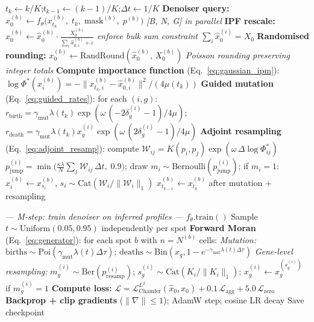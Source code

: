 \documentclass[11pt]{article}
\begin{document}
\begin{algorithm}[H]
\begin{algorithmic}[1]
      \State $t_k \leftarrow k/K$;\quad $t_{k-1} \leftarrow (k-1)/K$;\quad $\Delta t \leftarrow 1/K$
      \State \textbf{Denoiser query:}
        $\hat{x}_0^{(b)} \leftarrow f_\theta\!\bigl(x_{t_k}^{(b)},\; t_k,\; \text{mask}^{(b)},\; p^{(b)}\bigr)$
        \hfill\textit{[B, N, G] in parallel}
      \State \textbf{IPF rescale:} $\hat{x}_0^{(b)} \leftarrow \hat{x}_0^{(b)} \cdot \frac{X_0^{(b)}}{\sum_i \hat{x}_{0,i}^{(b)} + \varepsilon}$
        \hfill\textit{enforce bulk sum constraint $\sum_i \hat{x}_0^{(i)} = X_0$}
       
        \State \textbf{Randomised rounding:} $x_0^{(b)} \leftarrow \text{RandRound}(\hat{x}_0^{(b)},\, X_0^{(b)})$
        \hfill\textit{Poisson rounding preserving integer totals}
      \Else
        \State \textbf{Compute importance function} (Eq.~\ref{eq:gaussian_ipm}):
          $\log\Phi^*(x^{(b)}_i) = -\|x^{(b)}_{t_k,i} - \hat{x}_{0,i}^{(b)}\|^2 / (4\mu(t_k))$
        \State \textbf{Guided mutation} (Eq.~\ref{eq:guided_rates}): for each $(i,g)$:
        \Statex \qquad $r_{\text{birth}} = \gamma_{\text{mut}}\lambda(t_k)\exp(\omega\,(-2\delta_g^{(i)}-1)/4\mu)$;\;
                  $r_{\text{death}} = \gamma_{\text{mut}}\lambda(t_k) x_g^{(i)}\exp(\omega\,(2\delta_g^{(i)}-1)/4\mu)$
        \State \textbf{Adjoint resampling} (Eq.~\ref{eq:adjoint_resamp}): compute $\mathcal{W}_{ij} = K(p_i,p_j)\exp(\omega\,\Delta\log\Phi^*_{ij})$
        \Statex \qquad $p_{\text{jump}}^{(i)} = \min\!\bigl(\tfrac{\kappa\lambda}{N}\textstyle\sum_j \mathcal{W}_{ij}\,\Delta t,\; 0.9\bigr)$;
                  draw $m_i \sim \text{Bernoulli}(p_{\text{jump}}^{(i)})$;
                  if $m_i{=}1$: $x^{(b)}_i \leftarrow x^{(b)}_{s_i}$, $s_i \sim \text{Cat}(\mathcal{W}_i/\|\mathcal{W}_i\|_1)$
        \State $x_{t_{k-1}}^{(b)} \leftarrow x_{t_k}^{(b)}$ after mutation + resampling
      \EndIf
    \EndFor

    \Statex \hfill\textit{--- M-step: train denoiser on inferred profiles ---}
    \State $f_\theta.\text{train}()$
      \State Sample $t \sim \text{Uniform}(0.05, 0.95)$ independently per spot
      \State \textbf{Forward Moran} (Eq.~\ref{eq:generator}): for each spot $b$ with $n = N^{(b)}$ cells:
      \Statex \qquad \textit{Mutation:} $\text{births} \sim \text{Poi}(\gamma_{\text{mut}}\lambda(t)\Delta\tau)$;\;
               $\text{deaths} \sim \text{Bin}(x_g, 1{-}e^{-\gamma_{\text{mut}}\lambda(t)\Delta\tau})$
      \Statex \qquad \textit{Gene-level resampling:} $m_g^{(i)} \sim \text{Ber}(p_{\text{resamp}}^{(i)})$;\;
               $s_g^{(i)} \sim \text{Cat}(K_i/\|K_i\|_1)$;\;
               $x_g^{(i)} \leftarrow x_g^{(s_g^{(i)})}$ if $m_g^{(i)}{=}1$
      \State \textbf{Compute loss:}
        $\mathcal{L} = \mathcal{L}_{\text{Chamfer}}^{L^2}(\hat{x}_0, x_0) + 0.1\,\mathcal{L}_{\text{agg}} + 5.0\,\mathcal{L}_{\text{zero}}$
      \State \textbf{Backprop + clip gradients} ($\|\nabla\|\leq 1$); AdamW step; cosine LR decay
    \EndFor
  \EndFor
   Save checkpoint \EndIf
\EndFor
\end{algorithmic}
\end{algorithm}
\end{document}
